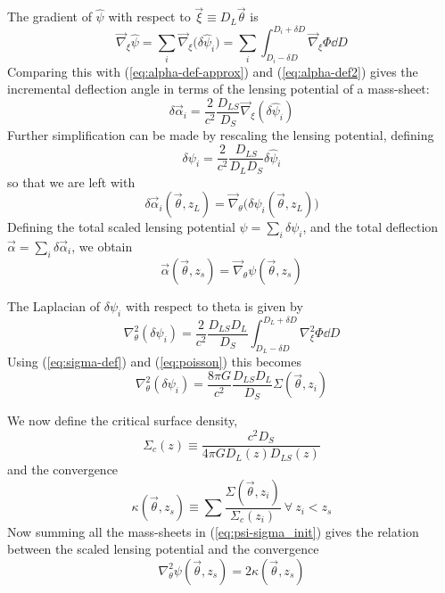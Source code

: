 The gradient of $\hat{\psi}$ with respect to 
$\vec{\xi} \equiv D_L\vec{\theta}$ is
\begin{equation}
  \vec{\nabla}_\xi\hat{\psi} 
  = \sum_i \vec{\nabla}_\xi\big(\delta\hat{\psi}_i\big) 
  = \sum_i \int_{D_i - \delta D}^{D_i+\delta D}\vec{\nabla}_\xi \Phi \dd D
\end{equation}
Comparing this with (\ref{eq:alpha-def-approx}) and (\ref{eq:alpha-def2}) gives the incremental deflection angle in terms of the lensing potential of a mass-sheet:
\begin{equation}
  \delta\vec{\alpha}_i = \frac{2}{c^2}\frac{D_{LS}}{D_S}\vec{\nabla}_\xi (\delta\hat{\psi}_i)
\end{equation}
Further simplification can be made by rescaling the lensing potential,
defining
\begin{equation}
  \delta\psi_i = \frac{2}{c^2}\frac{D_{LS}}{D_L D_S} \delta\hat{\psi}_i
\end{equation}
so that we are left with
\begin{equation}
  \label{eq:alpha-psi}
  \delta\vec{\alpha}_i(\vec{\theta},z_L) = \vec{\nabla}_\theta \Big( \delta\psi_i(\vec{\theta},z_L)\Big)
\end{equation}
Defining the total scaled lensing potential $\psi = \sum_i \delta\psi_i$, and the total deflection $\vec{\alpha} = \sum_i\delta\vec{\alpha}_i$, we obtain
\begin{equation}
  \vec{\alpha}(\vec{\theta},z_s) = \vec{\nabla}_\theta \psi(\vec{\theta},z_s)
\end{equation}

The Laplacian of $\delta\psi_i$ with respect to theta is given by
\begin{equation}
  \nabla_\theta^2 (\delta\psi_i) 
  = \frac{2}{c^2}\frac{D_{LS}D_L}{D_S}\int_{D_L-\delta D}^{D_L+\delta D} 
  \nabla_\xi^2\Phi \dd D
\end{equation}
Using (\ref{eq:sigma-def}) and (\ref{eq:poisson}) this becomes
\begin{equation}
  \label{eq:psi-sigma_init}
  \nabla_\theta^2(\delta\psi_i) = \frac{8\pi G}{c^2}\frac{D_{LS}D_L}{D_S}\Sigma(\vec{\theta},z_i)
\end{equation}

We now define the critical surface density,
\begin{equation}
  \Sigma_{c}(z) \equiv\frac{c^2 D_S}{4\pi G D_L(z) D_{LS}(z)}
\end{equation}
and the convergence
\begin{equation}
  \label{eq:kappa-sigma}
  \kappa(\vec{\theta},z_s) \equiv \sum \frac{\Sigma(\vec{\theta},z_i)}{\Sigma_c(z_i)}\ \forall\ z_i < z_s
\end{equation}
Now summing all the mass-sheets in (\ref{eq:psi-sigma_init}) gives the relation between the scaled lensing potential and the convergence
\begin{equation}
  \label{eq:psi-kappa-1}
  \nabla_\theta^2\psi(\vec{\theta},z_s) = 2\kappa(\vec{\theta},z_s)
\end{equation}

